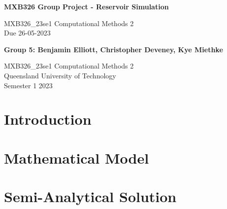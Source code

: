 \documentclass[11pt]{article}
\begin{document}

\begin{titlepage}
   \begin{center}
       \vspace*{6cm}

       \begin{large}\textbf{MXB326 Group Project - Reservoir Simulation}\end{large}

       \vspace{0.5cm}
        MXB326\_23se1 Computational Methods 2\\
        Due 26-05-2023
            
       \vspace{1.5cm}

       \textbf{Group 5: Benjamin Elliott, Christopher Deveney, Kye Miethke}

       \vfill
            
       MXB326\_23se1 Computational Methods 2\\
       Queensland University of Technology\\
       Semester 1 2023
            
   \end{center}
\end{titlepage}
\newpage


\tableofcontents
\newpage
{}


\section{Introduction}

\newpage
\section{Mathematical Model}

\newpage
\section{Semi-Analytical Solution}
\end{document}
